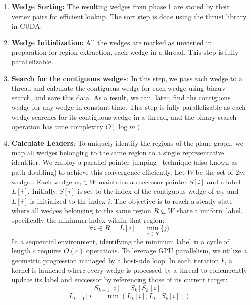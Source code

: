 \documentclass[conference]{IEEEtran}
\begin{document}
\begin{enumerate}
    \item \textbf{Wedge Sorting:} The resulting wedges from phase 1 are stored by their vertex pairs for efficient lookup. The sort step is done using the thrust library in CUDA.
    \item \textbf{Wedge Initialization:} All the wedges are marked as unvisited in preparation for region extraction, each wedge in a thread. This step is fully parallelizable.
    \item \textbf{Search for the contiguous wedges}: In this step, we pass each wedge to a thread and calculate the contiguous wedge for each wedge using binary search, and save this data. As a result, we can, later, find the contiguous wedge for any wedge in constant time. This step is fully parallelizable as each wedge searches for its contiguous wedge in a thread, and the binary search operation has time complexity \(O(\log m)\).
    \item \textbf{Calculate Leaders}: To uniquely identify the regions of the plane graph, we map all wedges belonging to the same region to a single representative identifier. We employ a parallel pointer jumping~\cite{jaja1992} technique (also known as path doubling) to achieve this convergence efficiently. Let $W$ be the set of $2m$ wedges. Each wedge $w_i \in W$ maintains a successor pointer $S[i]$ and a label $L[i]$. Initially, $S[i]$ is set to the index of the contiguous wedge of $w_i$, and $L[i]$ is initialized to the index $i$. The objective is to reach a steady state where all wedges belonging to the same region $R \subseteq W$ share a uniform label, specifically the minimum index within that region:
    $$\forall i \in R, \quad L[i] = \min_{j \in R} \{j\}$$
    In a sequential environment, identifying the minimum label in a cycle of length $c$ requires $O(c)$ operations. To leverage GPU parallelism, we utilize a geometric progression managed by a host-side loop. In each iteration $k$, a kernel is launched where every wedge is processed by a thread to concurrently update its label and successor by referencing those of its current target:
    $$S_{k+1}[i] = S_k[S_k[i]]$$
    $$L_{k+1}[i] = \min(L_k[i], L_k[S_k[i]])$$

\end{enumerate}
\end{document}
